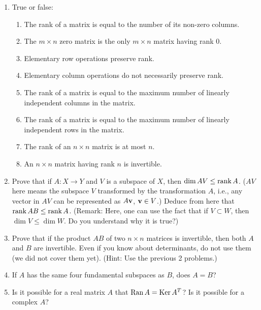 \documentclass[../psets.tex]{subfiles}
\begin{document}
\begin{enumerate}[label={\textbf{7.\arabic*.}}]
    \item True or false:
    \begin{enumerate}
        \item The rank of a matrix is equal to the number of its non-zero columns.
        \item The $m\times n$ zero matrix is the only $m\times n$ matrix having rank 0.
        \item Elementary row operations preserve rank.
        \item Elementary column operations do not necessarily preserve rank.
        \item The rank of a matrix is equal to the maximum number of linearly independent columns in the matrix.
        \item The rank of a matrix is equal to the maximum number of linearly independent rows in the matrix.
        \item The rank of an $n\times n$ matrix is at most $n$.
        \item An $n\times n$ matrix having rank $n$ is invertible.
    \end{enumerate}
    \setcounter{enumi}{3}
    \item Prove that if $A:X\to Y$ and $V$ is a subspace of $X$, then $\dim AV\leq\operatorname{rank} A$. ($AV$ here means the subspace $V$ transformed by the transformation $A$, i.e., any vector in $AV$ can be represented as $A\mathbf{v}$, $\mathbf{v}\in V$.) Deduce from here that $\operatorname{rank} AB\leq\operatorname{rank} A$. (Remark: Here, one can use the fact that if $V\subset W$, then $\dim V\leq\dim W$. Do you understand why it is true?)
    \item Prove that if the product $AB$ of two $n\times n$ matrices is invertible, then both $A$ and $B$ are invertible. Even if you know about determinants, do not use them (we did not cover them yet). (Hint: Use the previous 2 problems.)
    \setcounter{enumi}{8}
    \item If $A$ has the same four fundamental subspaces as $B$, does $A=B$?
    \setcounter{enumi}{13}
    \item Is it possible for a real matrix $A$ that $\operatorname{Ran} A=\operatorname{Ker} A^T$? Is it possible for a complex $A$?
\end{enumerate}
\end{document}
